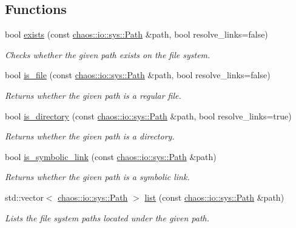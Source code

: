\subsection*{Functions}
\begin{DoxyCompactItemize}
\item 
bool \hyperlink{namespacechaos_1_1io_1_1sys_ae8f4abc1388c24e0ce7a655a50cd0212}{exists} (const \hyperlink{classchaos_1_1io_1_1sys_1_1_path}{chaos\+::io\+::sys\+::\+Path} \&path, bool resolve\+\_\+links=false)
\begin{DoxyCompactList}\small\item\em Checks whether the given path exists on the file system. \end{DoxyCompactList}\item 
bool \hyperlink{namespacechaos_1_1io_1_1sys_a2afa9dc6f049b03265731be671dbcb17}{is\+\_\+file} (const \hyperlink{classchaos_1_1io_1_1sys_1_1_path}{chaos\+::io\+::sys\+::\+Path} \&path, bool resolve\+\_\+links=false)
\begin{DoxyCompactList}\small\item\em Returns whether the given path is a regular file. \end{DoxyCompactList}\item 
bool \hyperlink{namespacechaos_1_1io_1_1sys_ad48945ad68ee4c84a37240ebc6b5a167}{is\+\_\+directory} (const \hyperlink{classchaos_1_1io_1_1sys_1_1_path}{chaos\+::io\+::sys\+::\+Path} \&path, bool resolve\+\_\+links=true)
\begin{DoxyCompactList}\small\item\em Returns whether the given path is a directory. \end{DoxyCompactList}\item 
bool \hyperlink{namespacechaos_1_1io_1_1sys_ac47b8476aea536b08a1c7a34b4e7e28c}{is\+\_\+symbolic\+\_\+link} (const \hyperlink{classchaos_1_1io_1_1sys_1_1_path}{chaos\+::io\+::sys\+::\+Path} \&path)
\begin{DoxyCompactList}\small\item\em Returns whether the given path is a symbolic link. \end{DoxyCompactList}\item 
std\+::vector$<$ \hyperlink{classchaos_1_1io_1_1sys_1_1_path}{chaos\+::io\+::sys\+::\+Path} $>$ \hyperlink{namespacechaos_1_1io_1_1sys_a21398064d60d0d4ac225a2c5004adf06}{list} (const \hyperlink{classchaos_1_1io_1_1sys_1_1_path}{chaos\+::io\+::sys\+::\+Path} \&path)
\begin{DoxyCompactList}\small\item\em Lists the file system paths located under the given path. \end{DoxyCompactList}\item 

\end{DoxyCompactItemize}

